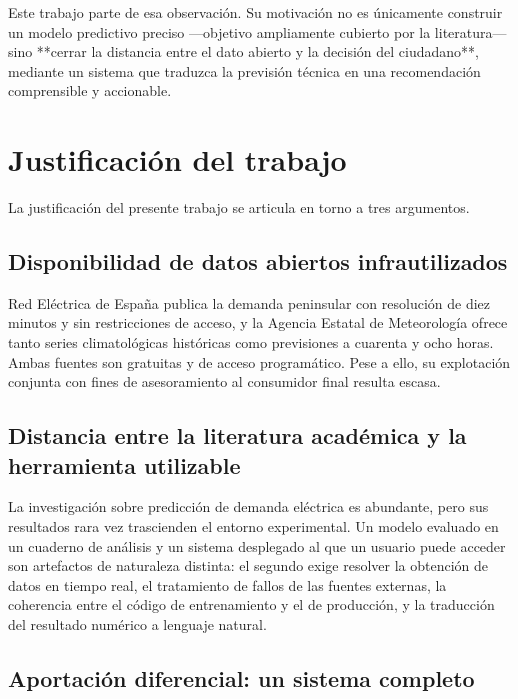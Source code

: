 Este trabajo parte de esa observación. Su motivación no es únicamente construir
un modelo predictivo preciso —objetivo ampliamente cubierto por la literatura—
sino **cerrar la distancia entre el dato abierto y la decisión del ciudadano**,
mediante un sistema que traduzca la previsión técnica en una recomendación
comprensible y accionable.



\section{Justificación del trabajo}

La justificación del presente trabajo se articula en torno a tres argumentos.

\subsection*{Disponibilidad de datos abiertos infrautilizados}

Red Eléctrica de España publica la demanda peninsular con resolución de diez
minutos y sin restricciones de acceso, y la Agencia Estatal de Meteorología
ofrece tanto series climatológicas históricas como previsiones a cuarenta y ocho
horas. Ambas fuentes son gratuitas y de acceso programático. Pese a ello, su
explotación conjunta con fines de asesoramiento al consumidor final resulta
escasa.

\subsection*{Distancia entre la literatura académica y la herramienta utilizable}

La investigación sobre predicción de demanda eléctrica es abundante, pero sus
resultados rara vez trascienden el entorno experimental. Un modelo evaluado en un
cuaderno de análisis y un sistema desplegado al que un usuario puede acceder son
artefactos de naturaleza distinta: el segundo exige resolver la obtención de
datos en tiempo real, el tratamiento de fallos de las fuentes externas, la
coherencia entre el código de entrenamiento y el de producción, y la traducción
del resultado numérico a lenguaje natural.

\subsection*{Aportación diferencial: un sistema completo}

